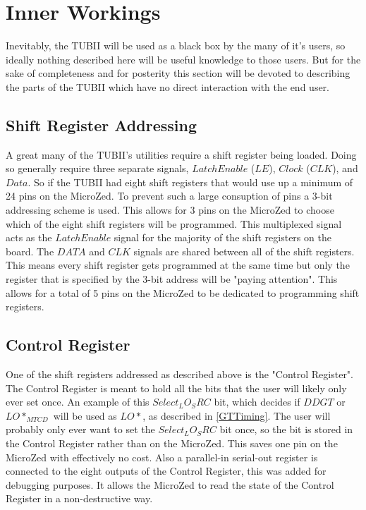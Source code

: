 \documentclass[11pt,a4paper]{article}
\begin{document}
\section{Inner Workings}
Inevitably, the TUBII will be used as a black box by the many of it's users, so ideally nothing described here will be useful knowledge to those users. But for the sake of completeness and for posterity this section will be devoted to describing the parts of the TUBII which have no direct interaction with the end user.

\subsection{Shift Register Addressing}
\label{SR_Addr}
A great many of the TUBII's utilities require a shift register being loaded. Doing so generally require three separate signals, $Latch Enable$ ($LE$), $Clock$ ($CLK$), and $Data$.
So if the TUBII had eight shift registers that would use up a minimum of 24 pins on the MicroZed. To prevent such a large consuption of pins a 3-bit addressing scheme is used. This allows for 3 pins on the MicroZed to choose which of the eight shift registers will be programmed. This multiplexed signal acts as the $LatchEnable$ signal for the majority of the shift registers on the board. The $DATA$ and $CLK$ signals are shared between all of the shift registers. This means every shift register gets programmed at the same time but only the register that is specified by the 3-bit address will be "paying attention". This allows for a total of 5 pins on the MicroZed to be dedicated to programming shift registers.
\subsection{Control Register}
One of the shift registers addressed as described above is the "Control Register". The Control Register is meant to hold all the bits that the user will likely only ever set once. An example of this $Select_LO_SRC$ bit, which decides if $DDGT$ or $LO*_{MTCD}$ will be used as $LO*$, as described in \ref{GTTiming}. The user will probably only ever want to set the $Select_LO_SRC$ bit once, so the bit is stored in the Control Register rather than on the MicroZed. This saves one pin on the MicroZed with effectively no cost. Also a parallel-in serial-out register is connected to the eight outputs of the Control Register, this was added for debugging purposes. It allows the MicroZed to read the state of the Control Register in a non-destructive way. 
\end{document}

